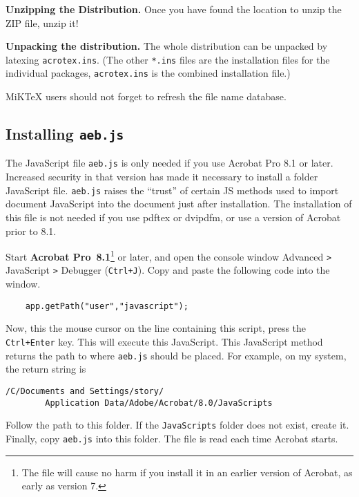 \documentclass{article}
\def\latex/{{\protect\LaTeX}}
\def\tex/{{\protect\TeX}}
\begin{document}
\begin{questions}
\item \textbf{Unzipping the Distribution.} Once you have found the
location to unzip the ZIP file, unzip it!



\item \textbf{Unpacking the distribution.} The whole distribution can be
unpacked by latexing \texttt{acrotex.ins}. (The other \texttt{*.ins} files
are the installation files for the individual packages,
\texttt{acrotex.ins} is the combined installation file.)

\item[] {MiK\TeX} users should not forget to refresh the file name database.


\end{questions}



\subsection{Installing \texttt{aeb.js}}

The JavaScript file \texttt{aeb.js} is only needed if you use
Acrobat Pro 8.1 or later. Increased security in that version has
made it necessary to install a folder JavaScript file.
\texttt{aeb.js} raises the ``trust'' of certain JS methods used to
import document JavaScript into the document just after
installation. The installation of this file is not needed if you use
pdftex or dvipdfm, or use a version of Acrobat prior to 8.1.

Start \textbf{Acrobat Pro~8.1}\footnote{The file will cause no harm
if you install it in an earlier version of Acrobat, as early as
version 7.} or later, and open the console window \textsf{Advanced
\texttt> JavaScript \texttt> Debugger} (\texttt{Ctrl+J}). Copy and
paste the following code into the window.
\begin{verbatim}
    app.getPath("user","javascript");
\end{verbatim}
Now, this the mouse cursor on the line containing this script, press
the \texttt{Ctrl+Enter} key. This will execute this JavaScript. This
JavaScript method returns the path to where \texttt{aeb.js} should
be placed. For example, on my system, the return string is
\begin{Verbatim}[fontsize=\small]
   /C/Documents and Settings/story/
        Application Data/Adobe/Acrobat/8.0/JavaScripts
\end{Verbatim}
Follow the path to this folder. If the \texttt{JavaScripts} folder
does not exist, create it.  Finally, copy \texttt{aeb.js}
into this folder. The file is read each time Acrobat starts.
\end{document}
